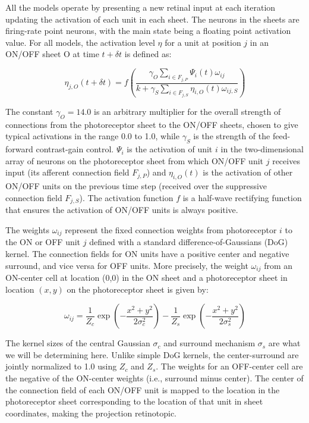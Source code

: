 All the models operate by presenting a new retinal input at each
iteration updating the activation of each unit in each sheet. The
neurons in the sheets are firing-rate point neurons, with the main
state being a floating point activation value.  For all models, the
activation level $\eta$ for a unit at position $j$ in an ON/OFF sheet
O at time $t+\delta t$ is defined as:

\begin{equation}
\eta_{j, O}(t+\delta t)=f\left(\frac{\gamma_{O}\sum_{i\in
    F_{j,P}}\Psi_{i}(t)\omega_{ij}}{k+\gamma_{S}\sum_{i\in
    F_{j,S}}\eta_{i, O}(t)\omega_{ij, S}}\right)
\label{eqn:lgnactivation}
\end{equation}

The constant $\gamma_{O}=14.0$ is an arbitrary multiplier for the
overall strength of connections from the photoreceptor sheet to the
ON/OFF sheets, chosen to give typical activations in the range 0.0 to
1.0, while $\gamma_{S}$ is the strength of the feed-forward
contrast-gain control. $\Psi_{i}$ is the activation of unit $i$ in the
two-dimensional array of neurons on the photoreceptor sheet from which
ON/OFF unit $j$ receives input (its afferent connection field
$F_{j,P}$) and $\eta_{i, O}(t)$ is the activation of other ON/OFF
units on the previous time step (received over the suppressive
connection field $F_{j,S}$). The activation function $f$ is a
half-wave rectifying function that ensures the activation of ON/OFF
units is always positive.

The weights $\omega_{ij}$ represent the fixed connection weights from
photoreceptor $i$ to the ON or OFF unit $j$ defined with a standard
difference-of-Gaussians (DoG) kernel. The connection fields for ON units
have a positive center and negative surround, and vice versa for OFF
units. More precisely, the weight $\omega_{ij}$ from an ON-center cell
at location (0,0) in the ON sheet and a photoreceptor sheet in
location $(x,y)$ on the photoreceptor sheet is given by:

\begin{equation}
\omega_{ij}=\frac{1}{Z_c}\exp{\left(-\frac{x^{2}+y^{2}}{2\sigma_{c}^{2}}\right)}-\frac{1}{Z_s}\exp\left(-\frac{x^{2}+y^{2}}{2\sigma_{s}^{2}}\right)
\label{eqn:DoG}
\end{equation}

The kernel sizes of the central Gaussian $\sigma_{c}$ and surround
mechanism $\sigma_{s}$ are what we will be determining here. Unlike
simple DoG kernels, the center-surround are jointly normalized to 1.0
using $Z_c$ and $Z_s$. The weights for an OFF-center cell are the
negative of the ON-center weights (i.e., surround minus center). The
center of the connection field of each ON/OFF unit is mapped to the
location in the photoreceptor sheet corresponding to the location of
that unit in sheet coordinates, making the projection retinotopic.

